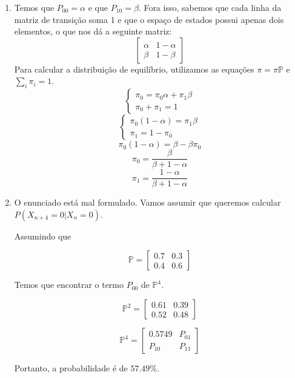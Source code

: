 \documentclass{article}
\begin{document}
\begin{enumerate}[label=(\alph*)]

    \item Temos que $P_{00}=\alpha$ e que $P_{10}=\beta$. Fora isso, sabemos que cada linha da matriz de transição soma 1 e que o espaço de estados possui apenas dois elementos, o que nos dá a seguinte matriz:
    $$\begin{bmatrix}
        \alpha & 1-\alpha\\
        \beta & 1-\beta
    \end{bmatrix}$$
    Para calcular a distribuição de equilíbrio, utilizamos as equações $\pi=\pi \mathbb{P}$ e $\sum_i{\pi_i}=1$.
    $$\begin{cases}
      \pi_0=\pi_0\alpha + \pi_1\beta\\
      \pi_0+\pi_1=1
    \end{cases}$$
    $$\begin{cases}
      \pi_0(1-\alpha)=\pi_1\beta\\
      \pi_1=1-\pi_0
    \end{cases}$$
    $$\pi_0(1-\alpha)=\beta-\beta\pi_0$$
    $$\pi_0=\frac{\beta}{\beta+1-\alpha}$$
    $$\pi_1=\frac{1-\alpha}{\beta+1-\alpha}$$
    
    \newpage
    
    \item O enunciado está mal formulado. Vamos assumir que queremos calcular $P(X_{n+4}=0|X_n=0)$.
    
    Assumindo que
    
    $$\mathbb{P}=\begin{bmatrix}
        0.7 & 0.3\\
        0.4 & 0.6
    \end{bmatrix}$$
    
    Temos que encontrar o termo $P_{00}$ de $\mathbb{P}^{4}$.
    
    $$\mathbb{P}^2=\begin{bmatrix}
        0.61 & 0.39\\
        0.52 & 0.48
    \end{bmatrix}$$
    
    $$\mathbb{P}^4=\begin{bmatrix}
        0.5749 & P_{01}\\
        P_{10} & P_{11}
    \end{bmatrix}$$
    
    Portanto, a probabilidade é de $57.49\%$.
    
    
    
\end{enumerate}
\end{document}
